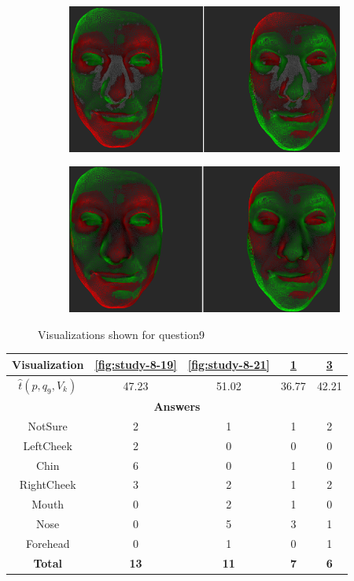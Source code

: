 \begin{figure}[h]
\begin{subfigure}{0.4\textwidth}
\includegraphics[width=\textwidth]{./screenshots/pair23.PNG}
\caption{}
\label{fig:study-8-23}
\end{subfigure}
\quad
\begin{subfigure}{0.4\textwidth}
\includegraphics[width=\textwidth]{./screenshots/pair20.PNG}
\caption{}
\label{fig:study-8-20}
\end{subfigure}
\caption{Visualizations shown for question9}
\end{figure}
\medskip

\begin{center}
\begin{tabular}{| c | c | c | c | c |}
	\hline
	Visualization & \ref{fig:study-8-19} & \ref{fig:study-8-21} & \ref{fig:study-8-23} & \ref{fig:study-8-20}\\ \hline
	\(\widehat{t}(p, q_9, V_k)\) & 47.23 & 51.02 & 36.77 & 42.21\\ \hline
	\multicolumn{5}{|c|}{\bf Answers} \\ \hline
	NotSure & 2 & 1 & 1 & 2\\ \hline
	LeftCheek & 2 & 0 & 0 & 0\\ \hline
	Chin & 6 & 0 & 1 & 0\\ \hline
	RightCheek & 3 & 2 & 1 & 2\\ \hline
	Mouth & 0 & 2 & 1 & 0\\ \hline
	Nose & 0 & 5 & 3 & 1\\ \hline
	Forehead & 0 & 1 & 0 & 1\\ \hline
	{\bf Total} & {\bf 13} & {\bf 11} & {\bf 7} & {\bf 6}\\ \hline
\end{tabular}
\end{center}
\clearpage

